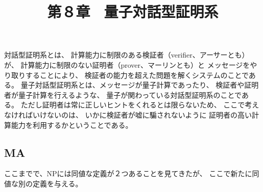 \documentclass[a4paper, 10pt]{jsarticle}
\title{第８章 \ 量子対話型証明系}
\author{}
\begin{document}
\maketitle

\setcounter{section}{8}

対話型証明系とは、
計算能力に制限のある検証者（verifier、アーサーとも）が、
計算能力に制限のない証明者（prover、マーリンとも）と
メッセージをやり取りすることにより、
検証者の能力を超えた問題を解くシステムのことである。
量子対話型証明系とは、メッセージが量子計算であったり、
検証者や証明者が量子計算を行えるような、
量子が関わっている対話型証明系のことである。
ただし証明者は常に正しいヒントをくれるとは限らないため、
ここで考えなければいけないのは、
いかに検証者が嘘に騙されないように
証明者の高い計算能力を利用するかということである。

\subsection{MA}
ここまでで、NPには同値な定義が２つあることを見てきたが、
ここで新たに同値な別の定義を与える。
\end{document}
